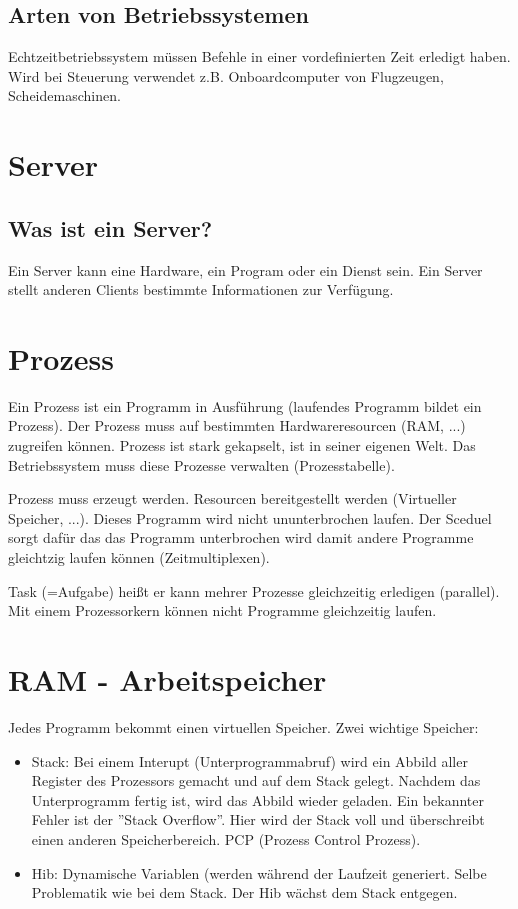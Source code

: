 \documentclass[a4paper]{report}
\begin{document}
{\section{Arten von Betriebssystemen}

Echtzeitbetriebssystem müssen Befehle in einer vordefinierten Zeit erledigt haben. Wird bei Steuerung verwendet z.B. Onboardcomputer von Flugzeugen, Scheidemaschinen.

\chapter{Server}

\section{Was ist ein Server?}

Ein Server kann eine Hardware, ein Program oder ein Dienst sein.
Ein Server stellt anderen Clients bestimmte Informationen zur Verfügung.

\chapter{Prozess}

Ein Prozess ist ein Programm in Ausführung (laufendes Programm bildet ein Prozess). Der Prozess muss auf bestimmten Hardwareresourcen (RAM, ...) zugreifen können. Prozess ist stark gekapselt, ist in seiner eigenen Welt. Das Betriebssystem muss diese Prozesse verwalten (Prozesstabelle).

Prozess muss erzeugt werden. Resourcen bereitgestellt werden (Virtueller Speicher, ...). Dieses Programm wird nicht ununterbrochen laufen. Der Sceduel sorgt dafür das das Programm unterbrochen wird damit andere Programme gleichtzig laufen können (Zeitmultiplexen).

Task (=Aufgabe) heißt er kann mehrer Prozesse gleichzeitig erledigen (parallel). Mit einem Prozessorkern können nicht Programme gleichzeitig laufen.


\chapter{RAM - Arbeitspeicher}

Jedes Programm bekommt einen virtuellen Speicher. Zwei wichtige Speicher:

\begin{itemize}
\item Stack: Bei einem Interupt (Unterprogrammabruf) wird ein Abbild aller Register des Prozessors gemacht und auf dem Stack gelegt. Nachdem das Unterprogramm fertig ist, wird das Abbild wieder geladen. Ein bekannter Fehler ist der ''Stack Overflow''. Hier wird der Stack voll und überschreibt einen anderen Speicherbereich. PCP (Prozess Control Prozess).
\item Hib: Dynamische Variablen (werden während der Laufzeit generiert. Selbe Problematik wie bei dem Stack. Der Hib wächst dem Stack entgegen.
\end{itemize}

}
\end{document}
